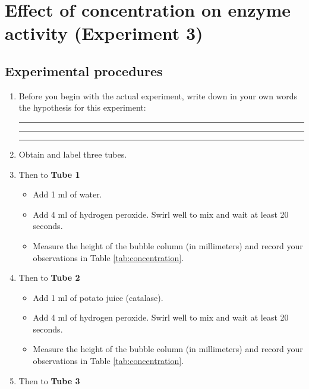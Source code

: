\documentclass[]{book}
\providecommand{\tightlist}{%
  \setlength{\itemsep}{0pt}\setlength{\parskip}{0pt}}
\begin{document}
\hypertarget{effect-of-concentration-on-enzyme-activity-experiment-3}{%
\section{Effect of concentration on enzyme activity (Experiment 3)}\label{effect-of-concentration-on-enzyme-activity-experiment-3}}

\hypertarget{experimental-procedures-22}{%
\subsection{Experimental procedures}\label{experimental-procedures-22}}

\begin{enumerate}
\def\labelenumi{\arabic{enumi}.}
\item
  Before you begin with the actual experiment, write down in your own words the hypothesis for this experiment:

  \begin{center}\rule{0.5\linewidth}{\linethickness}\end{center}

  \begin{center}\rule{0.5\linewidth}{\linethickness}\end{center}

  \begin{center}\rule{0.5\linewidth}{\linethickness}\end{center}
\item
  Obtain and label three tubes.
\item
  Then to \textbf{Tube 1}

  \begin{itemize}
  \tightlist
  \item
    Add 1 ml of water.
  \item
    Add 4 ml of hydrogen peroxide. Swirl well to mix and wait at least 20 seconds.
  \item
    Measure the height of the bubble column (in millimeters) and record your observations in Table \ref{tab:concentration}.
  \end{itemize}
\item
  Then to \textbf{Tube 2}

  \begin{itemize}
  \tightlist
  \item
    Add 1 ml of potato juice (catalase).
  \item
    Add 4 ml of hydrogen peroxide. Swirl well to mix and wait at least 20 seconds.
  \item
    Measure the height of the bubble column (in millimeters) and record your observations in Table \ref{tab:concentration}.
  \end{itemize}
\item
  Then to \textbf{Tube 3}


\end{enumerate}
\end{document}
